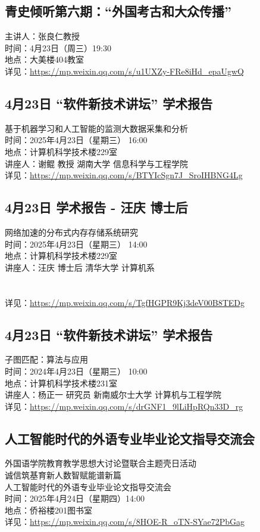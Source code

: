 \documentclass[letterpaper, 12pt]{article}
\begin{document}
\begin{multicols}{2}
\subsection{ 青史倾听第六期：“外国考古和大众传播”} %
主讲人：张良仁教授
\\时间：4月23日（周三）19:30
\\地点：大美楼404教室
\\详见：\url{https://mp.weixin.qq.com/s/u1UXZy-FRe8iHd_epaUgwQ}
\subsection{4月23日 “软件新技术讲坛” 学术报告} %
基于机器学习和人工智能的监测大数据采集和分析
\\时间：2025年4月23日（星期三） 16:00
\\地点：计算机科学技术楼229室
\\讲座人：谢鲲 教授 湖南大学 信息科学与工程学院
\\详见：\url{https://mp.weixin.qq.com/s/BTYIcSgn7J_SroIHBNG4Lg}
\subsection{4月23日 学术报告 - 汪庆 博士后} %
网络加速的分布式内存存储系统研究
\\时间：2025年4月23日（星期三） 14:00
\\地点：计算机科学技术楼229室
\\讲座人：汪庆 博士后 清华大学 计算机系
\\
\\
\\详见：\url{https://mp.weixin.qq.com/s/TgfHGPR9Kj3deV00B8TEDg}

\subsection{4月23日 “软件新技术讲坛” 学术报告} %
子图匹配：算法与应用
\\时间：2024年4月23日（星期三） 10:00
\\地点：计算机科学技术楼231室
\\讲座人：杨正一 研究员 新南威尔士大学 计算机与工程学院
\\详见：\url{https://mp.weixin.qq.com/s/drGNF1_9lLiHpRQn33D_rg}
\subsection{人工智能时代的外语专业毕业论文指导交流会} %
外国语学院教育教学思想大讨论暨联合主题壳日活动
\\诚信筑基育新人数智赋能谱新篇
\\人工智能时代的外语专业毕业论文指导交流会
\\时间：2025年4月24日（星期四）14:00
\\地点：侨裕楼201图书室
\\详见：\url{https://mp.weixin.qq.com/s/8HOE-R_oTN-SYae72PbGag}

\end{multicols}
\end{document}
